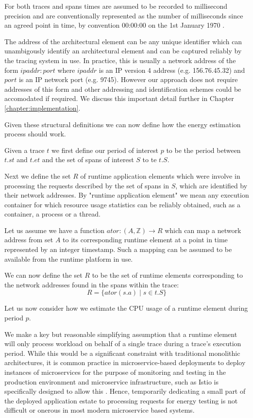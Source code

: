 For both traces and spans times are assumed to be recorded to millisecond precision and are conventionally represented as the number of milliseconds since an agreed point in time, by convention 00:00:00 on the 1st January 1970 \cite{josey2004-ieee1003}.

The address of the architectural element can be any unique identifier which can unambigously identify an architectural element and can be captured reliably by the tracing system in use.  In practice, this is usually a network address of the form $ipaddr:port$ where $ipaddr$ is an IP version 4 address (e.g. 156.76.45.32) and $port$ is an IP network port (e.g. 9745).  However our approach does not require addresses of this form and other addressing and identification schemes could be accomodated if required.  We discuss this important detail further in Chapter \ref{chapter:implementation}.

Given these structural definitions we can now define how the energy estimation process should work.

Given a trace $t$ we first define our period of interest $p$ to be the period between $t.st$ and $t.et$ and the set of spans of interest $S$ to te $t.S$.

Next we define the set $R$ of runtime application elements which were involve in processing the requests described by the set of spans in $S$, which are identified by their network addresses.  By "runtime application element" we mean any execution container for which resource usage statistics can be reliably obtained, such as a container, a process or a thread.

Let us assume we have a function $ator : (A,\mathbb{Z}) \to R$ which can map a network address from set $A$ to its corresponding runtime element at a point in time represented by an integer timestamp.  Such a mapping can be assumed to be available from the runtime platform in use.

We can now define the set $R$ to be the set of runtime elements corresponding to the network addresses found in the spans within the trace:
\begin{equation}
R = \{ ator(s.a) \mid s \in t.S \}
\end{equation}

Let us now consider how we estimate the CPU usage of a runtime element during period $p$.  

We make a key but reasonable simplifying assumption that a runtime element will only process workload on behalf of a single trace during a trace's execution period.  While this would be a significant constraint with traditional monolithic architectures, it is common practice in microservice-based deployments to deploy instances of microservices for the purpose of monitoring and testing in the production environment \cite{hilton2017-darklaunch} and microservice infrastructure, such as Istio is specifically designed to allow this \cite{istio2018-mirroring}.  Hence, temporarily dedicating a small part of the deployed application estate to processing requests for energy testing is not difficult or onerous in most modern microservice based systems.

